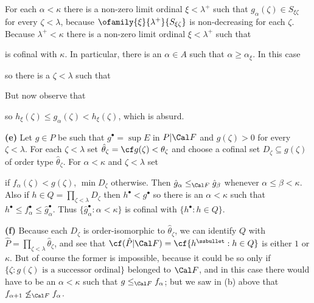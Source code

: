 {For each $\alpha<\kappa$ there is a non-zero limit ordinal $\xi<\lambda^+$
such that $g_{\alpha}(\zeta)\in S_{\xi\zeta}$ for every
$\zeta<\lambda$, because $\ofamily{\xi}{\lambda^+}{S_{\xi\zeta}}$ is
non-decreasing for each $\zeta$.
Because $\lambda^+<\kappa$ there is a non-zero
limit ordinal $\xi<\lambda^+$ such that


\noindent is cofinal with $\kappa$.   In particular, there is an
$\alpha\in A$ such that $\alpha\ge\alpha_{\xi}$.   In this case


\noindent so there is a $\zeta<\lambda$ such that


\noindent But now observe that


\noindent so $h_{\xi}(\zeta)\le g_{\alpha}(\zeta)<h_{\xi}(\zeta)$,
which is absurd.\ \Bang\Qed

\medskip

{\bf (e)} Let $g\in P$ be such that $g^{\bullet}=\sup E$ in
$P|\Cal F$
and $g(\zeta)>0$ for every $\zeta<\lambda$.  For each $\zeta<\lambda$
set $\hat\theta_{\zeta}=\cf g(\zeta)<\theta_{\zeta}$
and choose a cofinal set $D_{\zeta}\subseteq g(\zeta)$ of order type
$\hat\theta_{\zeta}$.   For $\alpha<\kappa$ and $\zeta<\lambda$ set


\noindent if $f_{\alpha}(\zeta)<g(\zeta)$,  $\min D_{\zeta}$
otherwise.   Then $\hat g_{\alpha}\le_{\Cal F}\hat g_{\beta}$
whenever $\alpha\le\beta<\kappa$.
Also if $h\in Q =\prod_{\zeta<\lambda}D_{\zeta}$ then
$h^{\bullet}<g^{\bullet}$ so there is an $\alpha<\kappa$ such that
$h^{\bullet}\le f_{\alpha}^{\bullet}\le\hat g_{\alpha}^{\bullet}$.
Thus $\{\hat g_{\alpha}^{\bullet}:\alpha<\kappa\}$ is cofinal with
$\{h^{\bullet}:h\in Q\}$.

\medskip

{\bf (f)}
Because each $D_{\zeta}$ is order-isomorphic to $\hat\theta_{\zeta}$,
we can identify $Q$ with
$\hat P=\prod_{\zeta<\lambda}\hat\theta_{\zeta}$,
and see that $\cf(\hat P|\Cal F)=\cf\{h^{\ssbullet}:h\in Q\}$
is either $1$ or $\kappa$.
But of course the former is impossible, because it could be so only
if $\{\zeta:g(\zeta)\text{ is a successor ordinal}\}$ belonged to
$\Cal F$,
and in this case there would have to be an $\alpha<\kappa$ such
that $g\le_{\Cal F}f_{\alpha}$;  but we saw in (b) above that
$f_{\alpha+1}\not\le_{\Cal F}f_{\alpha}$.

}
